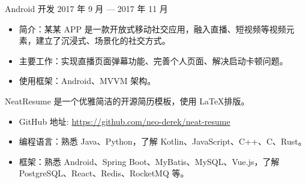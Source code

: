 \documentclass[10pt, a4paper]{article}
\begin{document}
    \mydelimiter
    
    
    
    Android 开发 \hfill 2017 年 9 月 --- 2017 年 11 月
    
    \begin{itemize}[leftmargin=*, topsep=0pt]
        \item 简介：某某 APP 是一款开放式移动社交应用，融入直播、短视频等视频元素，建立了沉浸式、场景化的社交方式。
        \item 主要工作：实现直播页面弹幕功能、完善个人页面、解决启动卡顿问题。
        \item 使用框架：Android、MVVM 架构。
    \end{itemize}
    
    \mydelimiter
    
    
    NeatResume 是一个优雅简洁的开源简历模板，使用 \LaTeX 排版。
    
    \begin{itemize}[leftmargin=*, topsep=0pt]
        \item GitHub 地址: \href{https://github.com/neo-derek/neat-resume}{\courierprime\fontsize{10}{12}\selectfont https://github.com/neo-derek/neat-resume}
    \end{itemize}
    
    \mydelimiter
    
    
    \begin{itemize}[leftmargin=*, topsep=0pt]
        \item 编程语言：熟悉 Java、Python，了解 Kotlin、JavaScript、C++、C、Rust。
        \item 框架：熟悉 Android、Spring Boot、MyBatis、MySQL、Vue.js，了解 PostgreSQL、React、Redis、RocketMQ 等。
    \end{itemize}
    
    
\end{document}
